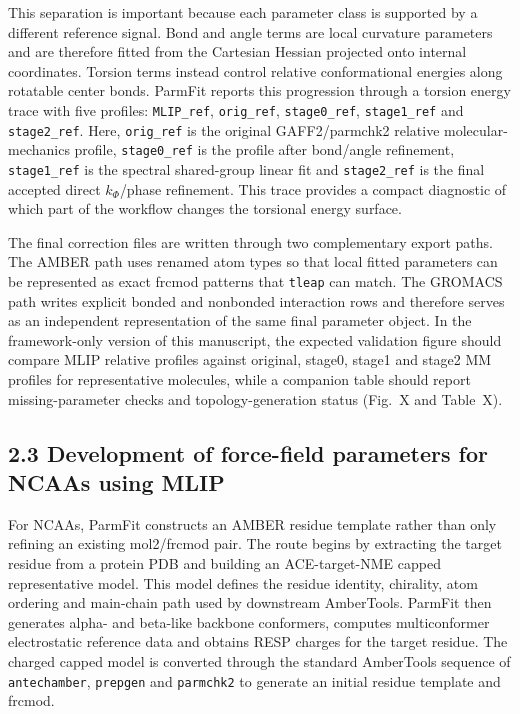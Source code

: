 This separation is important because each parameter class is supported by a different reference signal. Bond and angle terms are local curvature parameters and are therefore fitted from the Cartesian Hessian projected onto internal coordinates. Torsion terms instead control relative conformational energies along rotatable center bonds. ParmFit reports this progression through a torsion energy trace with five profiles: \texttt{MLIP\_ref}, \texttt{orig\_ref}, \texttt{stage0\_ref}, \texttt{stage1\_ref} and \texttt{stage2\_ref}. Here, \texttt{orig\_ref} is the original GAFF2/parmchk2 relative molecular-mechanics profile, \texttt{stage0\_ref} is the profile after bond/angle refinement, \texttt{stage1\_ref} is the spectral shared-group linear fit and \texttt{stage2\_ref} is the final accepted direct $k_{\Phi}$/phase refinement. This trace provides a compact diagnostic of which part of the workflow changes the torsional energy surface.

The final correction files are written through two complementary export paths. The AMBER path uses renamed atom types so that local fitted parameters can be represented as exact frcmod patterns that \texttt{tleap} can match. The GROMACS path writes explicit bonded and nonbonded interaction rows and therefore serves as an independent representation of the same final parameter object. In the framework-only version of this manuscript, the expected validation figure should compare MLIP relative profiles against original, stage0, stage1 and stage2 MM profiles for representative molecules, while a companion table should report missing-parameter checks and topology-generation status (Fig.~X and Table~X).

\subsection{2.3 Development of force-field parameters for NCAAs using MLIP}

For NCAAs, ParmFit constructs an AMBER residue template rather than only refining an existing mol2/frcmod pair. The route begins by extracting the target residue from a protein PDB and building an ACE-target-NME capped representative model. This model defines the residue identity, chirality, atom ordering and main-chain path used by downstream AmberTools. ParmFit then generates alpha- and beta-like backbone conformers, computes multiconformer electrostatic reference data and obtains RESP charges for the target residue. The charged capped model is converted through the standard AmberTools sequence of \texttt{antechamber}, \texttt{prepgen} and \texttt{parmchk2} to generate an initial residue template and frcmod.

